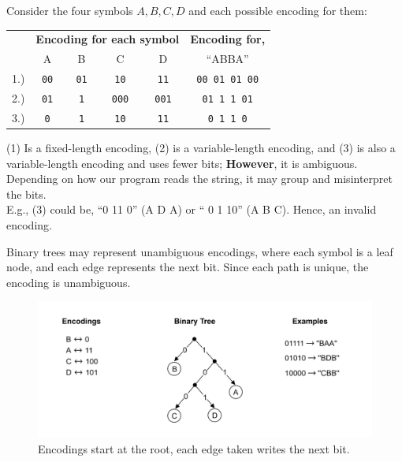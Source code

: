 \newpage 

\begin{Example}

    \label{ex:encoding_four}

    Consider the four symbols $A, B, C, D$ and each possible encoding for them:\\

    \noindent
    \begin{center}
   
  \begin{tabular}{c c c c c c}
    \toprule
    & \multicolumn{4}{c}{\textbf{Encoding for each symbol}} & \textbf{Encoding for,} \\
    &A & B & C & D & ``ABBA'' \\
    \midrule
    1.)&\texttt{00} & \texttt{01}  & \texttt{10}  & \texttt{11}  & \texttt{00 01 01 00} \\
    2.)&\texttt{01} & \texttt{1}   & \texttt{000} & \texttt{001} & \texttt{01 1 1 01}  \\
    3.)&\texttt{0}  & \texttt{1}   & \texttt{10}  & \texttt{11}  & \texttt{0 1 1 0}    \\
    \bottomrule
  \end{tabular}

    \end{center}

    \vspace{1em}
  \noindent
  (1) Is a fixed-length encoding, (2) is a variable-length encoding, and (3) is also a variable-length encoding and
  uses fewer bits; \textbf{However}, it is ambiguous. Depending on how our program reads the string, it may group and misinterpret 
  the bits.\\

  \noindent
  E.g., (3) could be, ``0 11 0'' (A D A) or `` 0 1 10'' (A B C). Hence, an invalid encoding.
\end{Example}

\begin{theo}

    \label{theo:binary_tree_encoding}

    Binary trees may represent unambiguous encodings, where each symbol is a leaf 
    node, and each edge represents the next bit. Since each path is unique, the encoding is unambiguous.
\end{theo}

\begin{figure}[ht!]

    \centering
    \includegraphics[width=\textwidth]{./Sections/comp/info/binary_tree_encoding.png}
    \caption{Encodings start at the root, each edge taken writes the next bit.}

    \label{fig:binary_tree_encoding}
\end{figure}

\newpage 

\newpage 



